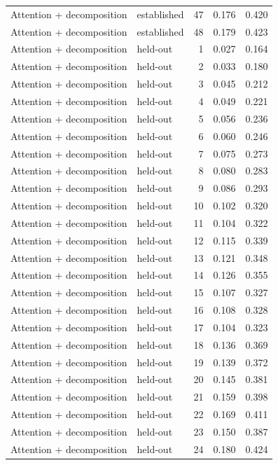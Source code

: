 \begin{tabular}{llrrr}
Attention + decomposition & established & 47 & 0.176 & 0.420 \\
Attention + decomposition & established & 48 & 0.179 & 0.423 \\
Attention + decomposition & held-out & 1 & 0.027 & 0.164 \\
Attention + decomposition & held-out & 2 & 0.033 & 0.180 \\
Attention + decomposition & held-out & 3 & 0.045 & 0.212 \\
Attention + decomposition & held-out & 4 & 0.049 & 0.221 \\
Attention + decomposition & held-out & 5 & 0.056 & 0.236 \\
Attention + decomposition & held-out & 6 & 0.060 & 0.246 \\
Attention + decomposition & held-out & 7 & 0.075 & 0.273 \\
Attention + decomposition & held-out & 8 & 0.080 & 0.283 \\
Attention + decomposition & held-out & 9 & 0.086 & 0.293 \\
Attention + decomposition & held-out & 10 & 0.102 & 0.320 \\
Attention + decomposition & held-out & 11 & 0.104 & 0.322 \\
Attention + decomposition & held-out & 12 & 0.115 & 0.339 \\
Attention + decomposition & held-out & 13 & 0.121 & 0.348 \\
Attention + decomposition & held-out & 14 & 0.126 & 0.355 \\
Attention + decomposition & held-out & 15 & 0.107 & 0.327 \\
Attention + decomposition & held-out & 16 & 0.108 & 0.328 \\
Attention + decomposition & held-out & 17 & 0.104 & 0.323 \\
Attention + decomposition & held-out & 18 & 0.136 & 0.369 \\
Attention + decomposition & held-out & 19 & 0.139 & 0.372 \\
Attention + decomposition & held-out & 20 & 0.145 & 0.381 \\
Attention + decomposition & held-out & 21 & 0.159 & 0.398 \\
Attention + decomposition & held-out & 22 & 0.169 & 0.411 \\
Attention + decomposition & held-out & 23 & 0.150 & 0.387 \\
Attention + decomposition & held-out & 24 & 0.180 & 0.424 \\

\end{tabular}
